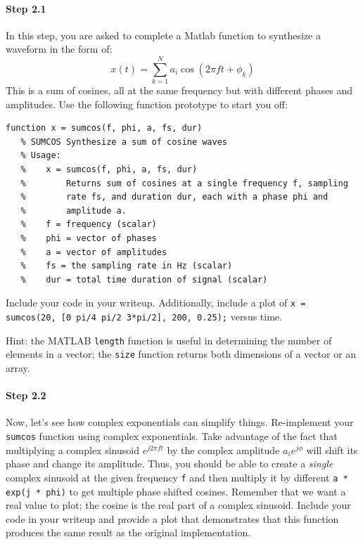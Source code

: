 \paragraph{Step 2.1} In this step, you are asked to complete a Matlab
function to synthesize a waveform in the form of:
\begin{equation*}
x(t) = \sum_{k=1}^N a_i\cos(2\pi f t + \phi_k)
\end{equation*}
This is a sum of cosines, all at the same frequency but with different
phases and amplitudes.  Use the following function prototype to start you off:
\begin{lstlisting}[style=Matlab-editor,basicstyle=\mlttfamily\small]
   function x = sumcos(f, phi, a, fs, dur)
   % SUMCOS Synthesize a sum of cosine waves
   % Usage:
   %    x = sumcos(f, phi, a, fs, dur)
   %        Returns sum of cosines at a single frequency f, sampling
   %        rate fs, and duration dur, each with a phase phi and
   %        amplitude a.
   %    f = frequency (scalar)
   %    phi = vector of phases
   %    a = vector of amplitudes
   %    fs = the sampling rate in Hz (scalar)
   %    dur = total time duration of signal (scalar)
\end{lstlisting}


Include your code in your writeup. Additionally, include a plot of
\texttt{x = sumcos(20, [0 pi/4 pi/2 3*pi/2], 200, 0.25);} versus
time.

Hint: the MATLAB \verb|length| function is useful in determining the
number of elements in a vector; the \verb|size| function returns both
dimensions of a vector or an array.


\paragraph{Step 2.2} Now, let's see how complex exponentials can
simplify things. Re-implement your \texttt{sumcos} function using
complex exponentials. Take advantage of the fact that multiplying a
complex sinusoid $e^{j2\pi f t}$ by the complex amplitude
$a_ie^{j\phi}$ will shift its phase and change its amplitude. Thus,
you should be able to create a \emph{single} complex sinusoid at the
given frequency \texttt{f} and then multiply it by different \texttt{a
  * exp(j * phi)} to get multiple phase shifted cosines. Remember that
we want a real value to plot; the cosine is the real part of a complex
sinusoid. Include your code in your writeup and provide a plot that
demonstrates that this function produces the same result as the
original implementation.


